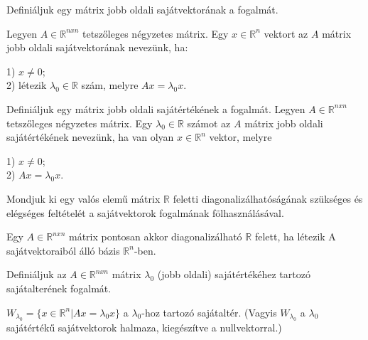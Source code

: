 \begin{frame}
  \begin{tcolorbox}[title={33}]
    Definiáljuk egy mátrix jobb oldali sajátvektorának a fogalmát.

  \tcblower
    Legyen $A \in \mathbb{R}^{n x n}$ tetszőleges négyzetes mátrix. Egy $x \in \mathbb{R}^n$ vektort az $A$ mátrix jobb oldali sajátvektorának nevezünk, ha:\\
    \mmedskip
    
    1) $x \neq 0$;\\
    2) létezik ${\lambda}_0 \in \mathbb{R}$ szám, melyre $Ax = {\lambda}_0x$.

  \end{tcolorbox}
\end{frame}


\begin{frame}
  \begin{tcolorbox}[title={34}]
   Definiáljuk egy mátrix jobb oldali sajátértékének a fogalmát.
  \tcblower
     Legyen $A \in \mathbb{R}^{n x n}$ tetszőleges négyzetes mátrix. Egy ${\lambda}_0 \in \mathbb{R}$ számot az $A$ mátrix jobb oldali sajátértékének nevezünk, ha van olyan $x \in \mathbb{R}^n$ vektor, melyre\\
     \mmedskip
     
     1) $x \neq 0$;\\
     2) $Ax = {\lambda}_0x$.

  \end{tcolorbox}
\end{frame}


\begin{frame}
  \begin{tcolorbox}[title={35}]
    Mondjuk ki egy valós elemű mátrix $\mathbb{R}$ feletti diagonalizálhatóságának szükséges és elégséges feltételét a sajátvektorok fogalmának fölhasználásával.

  \tcblower
Egy $A \in \mathbb{R}^{n x n}$ mátrix pontosan akkor diagonalizálható $\mathbb{R}$ felett, ha létezik A sajátvektoraiból álló bázis $\mathbb{R}^n$-ben. 
  \end{tcolorbox}
\end{frame}



\begin{frame}
  \begin{tcolorbox}[title={36}]
     Definiáljuk az $A \in \mathbb{R}^{n x n}$ mátrix ${\lambda}_0$ (jobb oldali) sajátértékéhez tartozó sajátalterének fogalmát.

  \tcblower
$W_{{\lambda}_0} = \{x \in \mathbb{R}^n |Ax = {\lambda}_0x\}$ a ${\lambda}_0$-hoz tartozó sajátaltér. (Vagyis $W_{{\lambda}_0}$ a ${\lambda}_0$ sajátértékű sajátvektorok halmaza, kiegészítve a nullvektorral.)

  \end{tcolorbox}
\end{frame}

